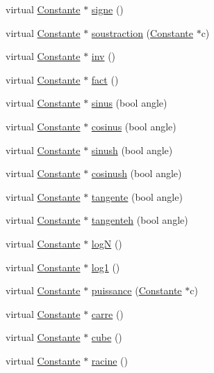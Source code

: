 \begin{DoxyCompactItemize}
\item 
virtual \hyperlink{class_constante}{\-Constante} $\ast$ \hyperlink{class_complexe_a97bb77958c4012ed113c54f895f91e85}{signe} ()
\item 
virtual \hyperlink{class_constante}{\-Constante} $\ast$ \hyperlink{class_complexe_a07d706446560190792339549752f9ea3}{soustraction} (\hyperlink{class_constante}{\-Constante} $\ast$c)
\item 
virtual \hyperlink{class_constante}{\-Constante} $\ast$ \hyperlink{class_complexe_afb48ef33e0289c8f05a959f83d9ec621}{inv} ()
\item 
virtual \hyperlink{class_constante}{\-Constante} $\ast$ \hyperlink{class_complexe_a0b0532339249783cee39f28670bb7504}{fact} ()
\item 
virtual \hyperlink{class_constante}{\-Constante} $\ast$ \hyperlink{class_complexe_a58574399ad50181f94c8f167916b9db9}{sinus} (bool angle)
\item 
virtual \hyperlink{class_constante}{\-Constante} $\ast$ \hyperlink{class_complexe_a5b659cad17efee687fb8a889aef5da09}{cosinus} (bool angle)
\item 
virtual \hyperlink{class_constante}{\-Constante} $\ast$ \hyperlink{class_complexe_a221161f63e9176b49eb74de70ef73d78}{sinush} (bool angle)
\item 
virtual \hyperlink{class_constante}{\-Constante} $\ast$ \hyperlink{class_complexe_a356e44404acabb3e6bd8228f746fc3f5}{cosinush} (bool angle)
\item 
virtual \hyperlink{class_constante}{\-Constante} $\ast$ \hyperlink{class_complexe_a7602a9b9ca6e17445207b3632ceba643}{tangente} (bool angle)
\item 
virtual \hyperlink{class_constante}{\-Constante} $\ast$ \hyperlink{class_complexe_a649a2ad523bfe715950e2e0f3b28213d}{tangenteh} (bool angle)
\item 
virtual \hyperlink{class_constante}{\-Constante} $\ast$ \hyperlink{class_complexe_a8adb5d883810b1fdbcfa230f32100408}{log\-N} ()
\item 
virtual \hyperlink{class_constante}{\-Constante} $\ast$ \hyperlink{class_complexe_ada2cd39fae72dcf78fac8b361072b4e1}{log1} ()
\item 
virtual \hyperlink{class_constante}{\-Constante} $\ast$ \hyperlink{class_complexe_aaebd8e53e61cdea5504fc8f9fa5d2523}{puissance} (\hyperlink{class_constante}{\-Constante} $\ast$c)
\item 
virtual \hyperlink{class_constante}{\-Constante} $\ast$ \hyperlink{class_complexe_a7bbaa8c8695253acb93eb91eb1bd51c0}{carre} ()
\item 
virtual \hyperlink{class_constante}{\-Constante} $\ast$ \hyperlink{class_complexe_a7026e226db2bb64a1ca5c014fa8b6f43}{cube} ()
\item 
virtual \hyperlink{class_constante}{\-Constante} $\ast$ \hyperlink{class_complexe_ab7d41a46e8467b819afa76f658a12c01}{racine} ()
\end{DoxyCompactItemize}


